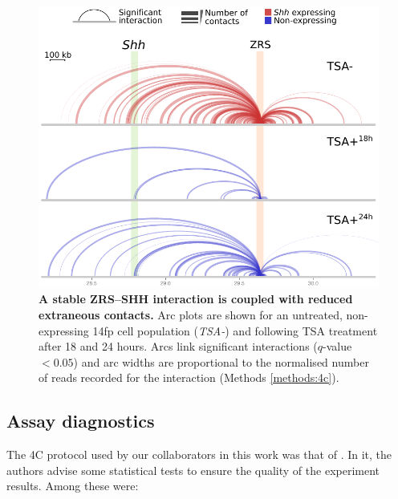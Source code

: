 \documentclass[a4paper,11pt,oneside]{book}
\begin{document}
\begin{figure}
\begin{center} 
\includegraphics[width=4.6in]{figs/4cArcs_v2.pdf}
\captionsetup{width=\textwidth} 
\caption[ A stable ZRS--SHH interaction is coupled with reduced extraneous contacts. ]{ {\bf A stable ZRS--SHH interaction is coupled with reduced extraneous contacts. }
Arc plots are shown for an untreated, non-expressing 14fp cell population (\emph{TSA-}) and following TSA treatment after 18 and 24 hours. Arcs link significant interactions ($q$-value $< 0.05$) and arc widths are proportional to the normalised number of reads recorded for the interaction (Methods \ref{methods:4c}).
}\label{fig:4carcs}
\end{center} 
\end{figure} 

%

\subsection{Assay diagnostics}

The 4C protocol used by our collaborators in this work was that of \citet{Stadhouders2013}. In it, the authors advise some statistical tests to ensure the quality of the experiment results. Among these were:\cite{Stadhouders2013}
\end{document}
